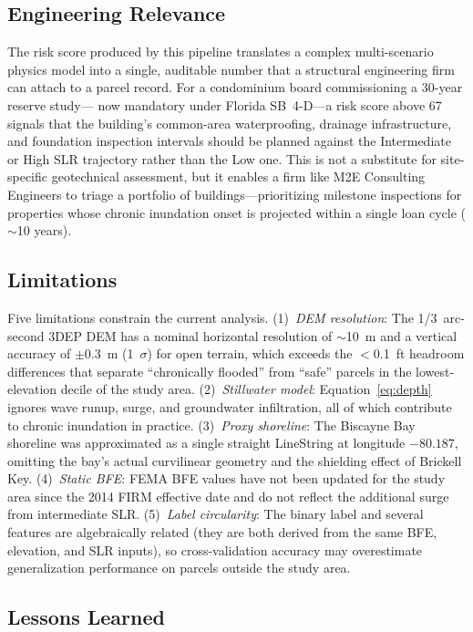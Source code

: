 \documentclass[conference]{IEEEtran}
\begin{document}
\subsection*{Engineering Relevance}

The risk score produced by this pipeline translates a complex
multi-scenario physics model into a single, auditable number that
a structural engineering firm can attach to a parcel record.
For a condominium board commissioning a 30-year reserve study—
now mandatory under Florida SB~4-D—a risk score above 67 signals
that the building's common-area waterproofing, drainage infrastructure,
and foundation inspection intervals should be planned against the
Intermediate or High SLR trajectory rather than the Low one.
This is not a substitute for site-specific geotechnical assessment,
but it enables a firm like M2E Consulting Engineers to triage a
portfolio of buildings—prioritizing milestone inspections for
properties whose chronic inundation onset is projected within a
single loan cycle ($\sim$10 years).

\subsection*{Limitations}

Five limitations constrain the current analysis.
(1)~\textit{DEM resolution}: The 1/3~arc-second 3DEP DEM has a nominal
horizontal resolution of $\sim$10~m and a vertical accuracy of
$\pm$0.3~m (1~$\sigma$) for open terrain, which exceeds the
$<$0.1~ft headroom differences that separate ``chronically flooded''
from ``safe'' parcels in the lowest-elevation decile of the study area.
(2)~\textit{Stillwater model}: Equation~\eqref{eq:depth} ignores wave
runup, surge, and groundwater infiltration, all of which contribute
to chronic inundation in practice.
(3)~\textit{Proxy shoreline}: The Biscayne Bay shoreline was approximated
as a single straight LineString at longitude $-80.187$, omitting
the bay's actual curvilinear geometry and the shielding effect of
Brickell Key.
(4)~\textit{Static BFE}: FEMA BFE values have not been updated for the
study area since the 2014 FIRM effective date and do not reflect
the additional surge from intermediate SLR.
(5)~\textit{Label circularity}: The binary label and several features are
algebraically related (they are both derived from the same BFE,
elevation, and SLR inputs), so cross-validation accuracy may
overestimate generalization performance on parcels outside the
study area.

\subsection*{Lessons Learned}
\end{document}

